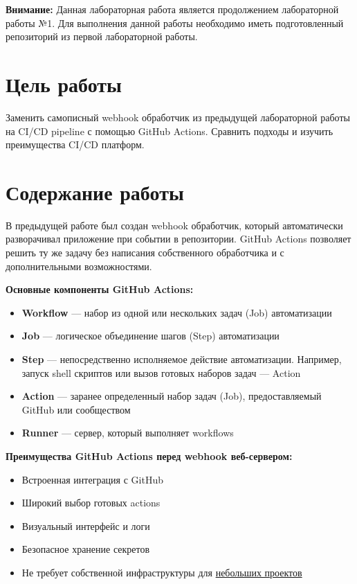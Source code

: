 \documentclass[12pt,a4paper]{article}
\begin{document}
\makelabcover

\commoninstructions

\textbf{Внимание:} Данная лабораторная работа является продолжением лабораторной работы №1.
Для выполнения данной работы необходимо иметь подготовленный репозиторий из первой лабораторной работы.

\section{Цель работы}

Заменить самописный webhook обработчик из предыдущей лабораторной работы на CI/CD pipeline с помощью GitHub Actions.
Сравнить подходы и изучить преимущества CI/CD платформ.

\section{Содержание работы}

В предыдущей работе был создан webhook обработчик, который автоматически разворачивал приложение при событии в репозитории.
GitHub Actions позволяет решить ту же задачу без написания собственного обработчика и с дополнительными возможностями.

\vspace{0.5cm}
\textbf{Основные компоненты GitHub Actions:}
\begin{itemize}
    \item \textbf{Workflow} — набор из одной или нескольких задач (Job) автоматизации
    \item \textbf{Job} — логическое объединение шагов (Step) автоматизации
    \item \textbf{Step} — непосредственно исполняемое действие автоматизации.
    Например, запуск shell скриптов или вызов готовых наборов задач — Action
    \item \textbf{Action} — заранее определенный набор задач (Job), предоставляемый GitHub или сообществом
    \item \textbf{Runner} — сервер, который выполняет workflows
\end{itemize}

\vspace{0.5cm}
\textbf{Преимущества GitHub Actions перед webhook веб-сервером:}
\begin{itemize}
    \item Встроенная интеграция с GitHub
    \item Широкий выбор готовых actions
    \item Визуальный интерфейс и логи
    \item Безопасное хранение секретов
    \item Не требует собственной инфраструктуры для \href{https://docs.github.com/en/billing/concepts/product-billing/github-actions?versionId=free-pro-team%40latest&productId=actions&restPage=get-started%2Cunderstand-github-actions#free-use-of-github-actions}{небольших проектов}
\end{itemize}
\end{document}
